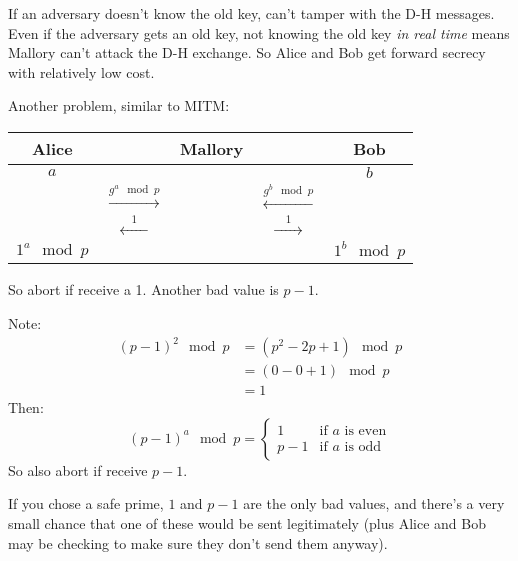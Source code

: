 If an adversary doesn't know the old key, can't tamper with the D-H messages.
Even if the adversary gets an old key, not knowing the old key \emph{in real
time} means Mallory can't attack the D-H exchange. So Alice and Bob get forward
secrecy with relatively low cost.

Another problem, similar to MITM:

\begin{table}[h!]
\centering
\begin{tabular}{ccccc}
Alice & & Mallory & & Bob\\
\hline
$a$ & & & & $b$\\
& $\xrightarrow{g^a \mod p}$ & & $\xleftarrow{g^b \mod p}$ &\\
& $\xleftarrow{\quad1\quad}$ & & $\xrightarrow{\quad1\quad}$ &\\
$1^a \mod p$ & & & & $1^b \mod p$
\end{tabular}
\end{table}

So abort if receive a 1. Another bad value is $p-1$.

Note: \begin{align*}
\left(p-1\right)^2 \mod p &= \left(p^2 - 2p + 1\right) \mod p\\
    &= (0-0+1) \mod p\\
    &= 1
\end{align*}
Then:
$$\left(p-1\right)^a \mod p = \begin{cases}1 &\mbox{if $a$ is even}\\
    p-1 &\mbox{if $a$ is odd}\end{cases}$$
So also abort if receive $p-1$.

If you chose a safe prime, $1$ and $p-1$ are the only bad values, and there's a
very small chance that one of these would be sent legitimately (plus Alice and
Bob may be checking to make sure they don't send them anyway).
